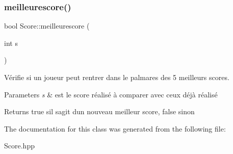 \subsubsection{\texorpdfstring{meilleurescore()}{meilleurescore()}}
{\footnotesize\ttfamily bool Score\+::meilleurescore (\begin{DoxyParamCaption}\item[{int}]{s }\end{DoxyParamCaption})}



Vérifie si un joueur peut rentrer dans le palmares des 5 meilleurs scores. 


\begin{DoxyParams}{Parameters}
{\em s} & est le score réalisé à comparer avec ceux déjà réalisé \\
\hline
\end{DoxyParams}
\begin{DoxyReturn}{Returns}
true s\textquotesingle{}il s\textquotesingle{}agit d\textquotesingle{}un nouveau meilleur score, false sinon 
\end{DoxyReturn}


The documentation for this class was generated from the following file\+:\begin{DoxyCompactItemize}
\item 
Score.\+hpp\end{DoxyCompactItemize}

